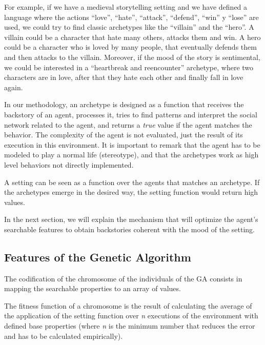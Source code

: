 \documentclass[letterpaper]{article}
\begin{document}
For example, if we have a medieval storytelling setting and we have defined a language where the actions ``love'', ``hate'', ``attack'', ``defend'', ``win'' y ``lose'' are used, we could try to find classic 
archetypes like the ``villain'' and the ``hero''. A villain could be a character that hate many others, attacks them and win. A hero could be a character who is loved by many people, that eventually defends them and then attacks to the villain. Moreover, if the mood of the story is sentimental, we could be interested in a ``heartbreak and reencounter'' archetype, where two characters are in love, after that they hate each other and finally fall in love again.

In our methodology, an archetype is designed as a function that receives the backstory of an agent, processes it, tries to find patterns and interpret the social network related to the agent, and returns a {\em true} value if the agent matches the behavior. 
The complexity of the agent is not evaluated, just the result of its execution in this environment. It is important to remark that the agent has to be modeled to play a normal life (stereotype), and that the archetypes work as high level behaviors not directly implemented.

A setting can be seen as a function over the agents that matches an archetype. If the archetypes emerge in the desired way, the setting function would return high values.

In the next section, we will explain the mechanism that will optimize the agent's searchable features to obtain backstories coherent with the mood of the setting.

\subsection{Features of the Genetic Algorithm}


The codification of the chromosome of the individuals of the GA consists in mapping the searchable properties to an array of values. %

The fitness function of a chromosome is the result of calculating the average of the application of the setting function over \textit{n} executions of the environment with defined base properties (where \textit{n} is the minimum number that reduces the error and has to be calculated empirically).
\end{document}
